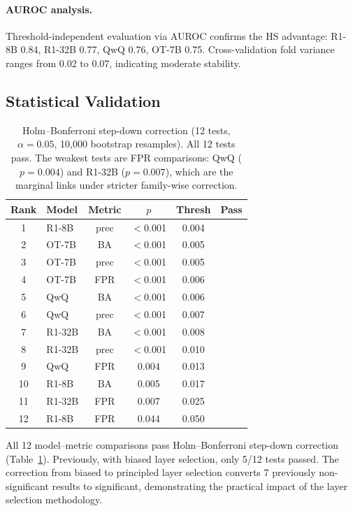 \documentclass[11pt,a4paper]{article}
\newcommand{\cmark}{\checkmark}
\begin{document}
\paragraph{AUROC analysis.}
Threshold-independent evaluation via AUROC confirms the HS advantage: R1-8B 0.84, R1-32B 0.77, QwQ 0.76, OT-7B 0.75.
Cross-validation fold variance ranges from 0.02 to 0.07, indicating moderate stability.

\subsection{Statistical Validation}
\label{sec:stats}

\begin{table}[t]
\centering
\small
\begin{tabular}{clcccl}
\toprule
\textbf{Rank} & \textbf{Model} & \textbf{Metric} & \textbf{$p$} & \textbf{Thresh} & \textbf{Pass} \\
\midrule
1 & R1-8B & prec & $<$0.001 & 0.004 & \cmark \\
2 & OT-7B & BA & $<$0.001 & 0.005 & \cmark \\
3 & OT-7B & prec & $<$0.001 & 0.005 & \cmark \\
4 & OT-7B & FPR & $<$0.001 & 0.006 & \cmark \\
5 & QwQ & BA & $<$0.001 & 0.006 & \cmark \\
6 & QwQ & prec & $<$0.001 & 0.007 & \cmark \\
7 & R1-32B & BA & $<$0.001 & 0.008 & \cmark \\
8 & R1-32B & prec & $<$0.001 & 0.010 & \cmark \\
9 & QwQ & FPR & 0.004 & 0.013 & \cmark \\
10 & R1-8B & BA & 0.005 & 0.017 & \cmark \\
11 & R1-32B & FPR & 0.007 & 0.025 & \cmark \\
12 & R1-8B & FPR & 0.044 & 0.050 & \cmark \\
\bottomrule
\end{tabular}
\caption{Holm--Bonferroni step-down correction (12 tests, $\alpha = 0.05$, 10,000 bootstrap resamples). All 12 tests pass. The weakest tests are FPR comparisons: QwQ ($p=0.004$) and R1-32B ($p=0.007$), which are the marginal links under stricter family-wise correction.}
\label{tab:holm-bonf}
\end{table}

All 12 model--metric comparisons pass Holm--Bonferroni step-down correction (Table~\ref{tab:holm-bonf}).
Previously, with biased layer selection, only 5/12 tests passed.
The correction from biased to principled layer selection converts 7 previously non-significant results to significant, demonstrating the practical impact of the layer selection methodology.
\end{document}
